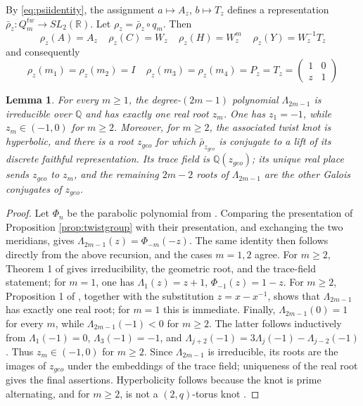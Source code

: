 \documentclass{article}
\theoremstyle{plain}
\theoremstyle{definition}
\theoremstyle{plain}
\theoremstyle{plain}
\theoremstyle{plain}
\newtheorem{lemma}[theorem]{Lemma}
\theoremstyle{remark}
\theoremstyle{remark}
\theoremstyle{plain}
\theoremstyle{plain}
\newcounter{main}
\theoremstyle{plain}
\theoremstyle{plain}
\begin{document}
By \eqref{eq:psiidentity}, the assignment $a \mapsto A_z$, $b \mapsto T_z$ defines a representation $\bar\rho_z: Q_m^{tw} \to SL_2(\mathbb R)$. Let $\rho_z = \bar\rho_z \circ q_m$. Then
\begin{equation*}
	\rho_z(A) = A_z \ \ \ \ \ \rho_z(C) = W_z \ \ \ \ \ \rho_z(H) = W_z^m \ \ \ \ \ \rho_z(Y) = W_z^{-1}T_z
\end{equation*}
and consequently 
\begin{equation*}
	\rho_z(m_1)  = \rho_z(m_2) = I \ \ \ \ \ \rho_z(m_3) = \rho_z(m_4) = P_z = T_z = \begin{pmatrix}1 & 0 \\ z & 1\end{pmatrix}
\end{equation*}

\begin{lemma}\label{lma:twistroots}
For every $m \geq 1$, the degree-$(2m-1)$ polynomial $\Lambda_{2m-1}$ is irreducible over $\mathbb Q$ and has exactly one real root $z_m$. One has $z_1 = -1$, while $z_m \in (-1, 0)$ for $m \geq 2$. Moreover, for $m \ge 2$, the associated twist knot is hyperbolic, and there is a root $z_{geo}$ for which $\bar\rho_{z_{geo}}$ is conjugate to a lift of its discrete faithful representation. Its trace field is $\mathbb Q(z_{geo})$; its unique real place sends $z_{geo}$ to $z_m$, and the remaining $2m-2$ roots of $\Lambda_{2m-1}$ are the other Galois conjugates of $z_{geo}$. 
\end{lemma}

\begin{proof}
Let $\Phi_n$ be the parabolic polynomial from \cite{hosteshanahan}. Comparing the presentation of Proposition \ref{prop:twistgroup} with their presentation, and exchanging the two meridians, gives $\Lambda_{2m-1}(z) = \Phi_{-m}(-z)$. The same identity then follows directly from the above recursion, and the cases $m = 1, 2$ agree. For $m \geq 2$, Theorem 1 of \cite{hosteshanahan} gives irreducibility, the geometric root, and the trace-field statement; for $m = 1$, one has $\Lambda_1(z) = z + 1$, $\Phi_{-1}(z) = 1 - z$. For $m \geq 2$, Proposition 1 of \cite{hosteshanahan}, together with the substitution $z = x - x^{-1}$, shows that $\Lambda_{2m-1}$ has exactly one real root; for $m = 1$ this is immediate. Finally, $\Lambda_{2m-1}(0) = 1$ for every $m$, while $\Lambda_{2m-1}(-1) < 0$ for $m \geq 2$. The latter follows inductively from $\Lambda_1(-1) = 0$, $\Lambda_3(-1) = -1$, and $\Lambda_{j+2}(-1) = 3\Lambda_j(-1) - \Lambda_{j-2}(-1)$. Thus $z_m \in (-1, 0)$ for $m \geq 2$. Since $\Lambda_{2m-1}$ is irreducible, its roots are the images of $z_{geo}$ under the embeddings of the trace field; uniqueness of the real root gives the final assertions. Hyperbolicity follows because the knot is prime alternating, and for $m \geq 2$, is not a $(2, q)$-torus knot \cite{menasco}. 
\end{proof}
\end{document}
